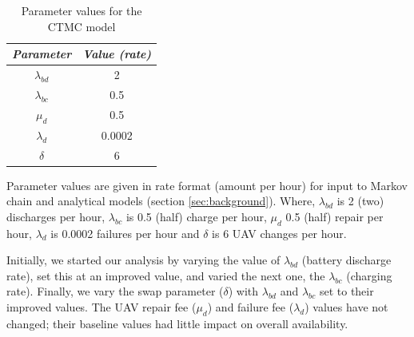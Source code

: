 \documentclass[conference]{IEEEtran}
\begin{document}
\begin{table}[htbp]
\caption{Parameter values for the CTMC model}
\begin{center}
\begin{tabular}{|c|c|}
\hline
\textbf{\textit{Parameter}} & \textbf{\textit{Value (rate)}} \\
\hline
  \(\lambda_{bd}\)  & 2 \\
  \(\lambda_{bc}\)   & 0.5 \\
 \(\mu_{d}\)   & 0.5  \\
 \(\lambda_{d}\)  & 0.0002 \\
 \(\delta\)  & 6 \\
\hline
\end{tabular}
\label{tab:ctmc_parameter_values}
\end{center}
\end{table}

Parameter values are given in rate format (amount per hour) for input to Markov chain and analytical models (section \ref{sec:background}). Where, $\lambda_{bd}$ is 2 (two) discharges per hour, $\lambda_{bc}$ is 0.5 (half) charge per hour, $\mu_{d}$ 0.5 (half) repair per hour, $ \lambda_{d}$ is 0.0002 failures per hour and $\delta$ is 6 UAV changes per hour.

Initially, we started our analysis by varying the value of $\lambda_{bd}$ (battery discharge rate), set this at an improved value, and varied the next one, the $\lambda_{bc}$ (charging rate). Finally, we vary the swap parameter ($\delta$) with $\lambda_{bd}$ and $\lambda_{bc}$ set to their improved values. The UAV repair fee ($\mu_{d}$) and failure fee ($\lambda_{d}$) values have not changed; their baseline values had little impact on overall availability.
\end{document}
